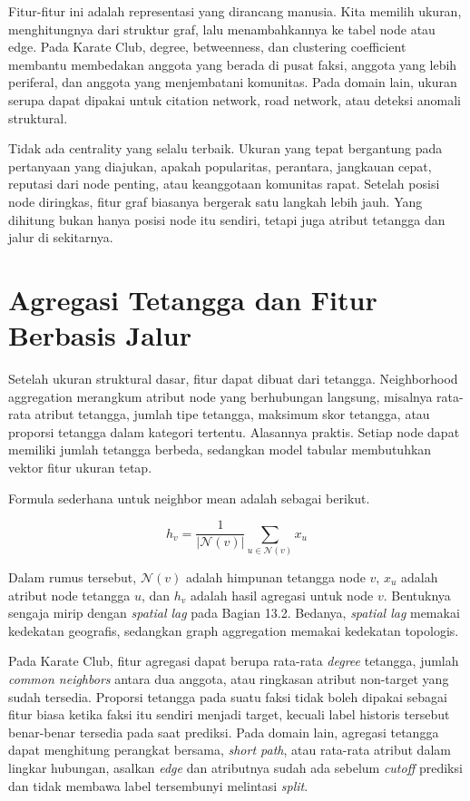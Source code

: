 Fitur-fitur ini adalah representasi yang dirancang manusia. Kita memilih ukuran, menghitungnya dari struktur graf, lalu menambahkannya ke tabel node atau edge. Pada Karate Club, degree, betweenness, dan clustering coefficient membantu membedakan anggota yang berada di pusat faksi, anggota yang lebih periferal, dan anggota yang menjembatani komunitas. Pada domain lain, ukuran serupa dapat dipakai untuk citation network, road network, atau deteksi anomali struktural.

Tidak ada centrality yang selalu terbaik. Ukuran yang tepat bergantung pada pertanyaan yang diajukan, apakah popularitas, perantara, jangkauan cepat, reputasi dari node penting, atau keanggotaan komunitas rapat. Setelah posisi node diringkas, fitur graf biasanya bergerak satu langkah lebih jauh. Yang dihitung bukan hanya posisi node itu sendiri, tetapi juga atribut tetangga dan jalur di sekitarnya.

\section{Agregasi Tetangga dan Fitur Berbasis Jalur}\label{agregasi-tetangga-dan-fitur-berbasis-jalur}

Setelah ukuran struktural dasar, fitur dapat dibuat dari tetangga. Neighborhood aggregation merangkum atribut node yang berhubungan langsung, misalnya rata-rata atribut tetangga, jumlah tipe tetangga, maksimum skor tetangga, atau proporsi tetangga dalam kategori tertentu. Alasannya praktis. Setiap node dapat memiliki jumlah tetangga berbeda, sedangkan model tabular membutuhkan vektor fitur ukuran tetap.

Formula sederhana untuk neighbor mean adalah sebagai berikut.

\[
h_v = \dfrac{1}{|\mathcal{N}(v)|} \sum_{u \in \mathcal{N}(v)} x_u
\]

Dalam rumus tersebut, \(\mathcal{N}(v)\) adalah himpunan tetangga node \(v\), \(x_u\) adalah atribut node tetangga \(u\), dan \(h_v\) adalah hasil agregasi untuk node \(v\). Bentuknya sengaja mirip dengan \emph{spatial lag} pada Bagian 13.2. Bedanya, \emph{spatial lag} memakai kedekatan geografis, sedangkan graph aggregation memakai kedekatan topologis.

Pada Karate Club, fitur agregasi dapat berupa rata-rata \emph{degree} tetangga, jumlah \emph{common neighbors} antara dua anggota, atau ringkasan atribut non-target yang sudah tersedia. Proporsi tetangga pada suatu faksi tidak boleh dipakai sebagai fitur biasa ketika faksi itu sendiri menjadi target, kecuali label historis tersebut benar-benar tersedia pada saat prediksi. Pada domain lain, agregasi tetangga dapat menghitung perangkat bersama, \emph{short path}, atau rata-rata atribut dalam lingkar hubungan, asalkan \emph{edge} dan atributnya sudah ada sebelum \emph{cutoff} prediksi dan tidak membawa label tersembunyi melintasi \emph{split}.

